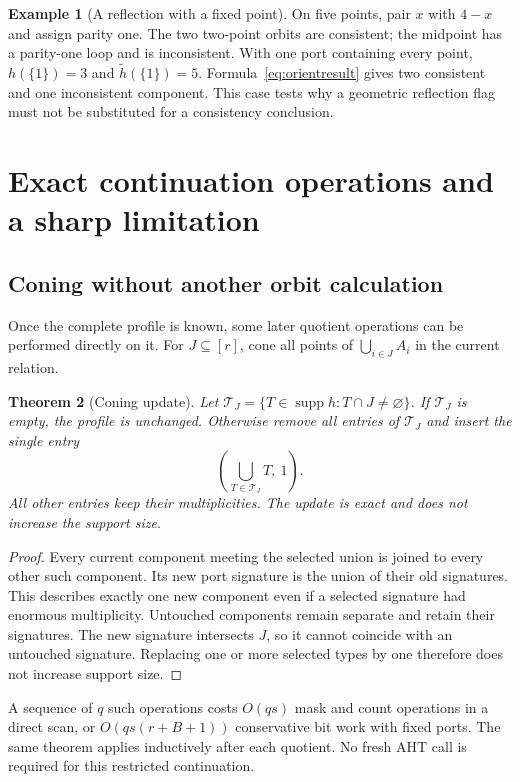 \documentclass[11pt]{article}
\newtheorem{theorem}{Theorem}[section]
\theoremstyle{definition}
\newtheorem{example}[theorem]{Example}
\newcommand{\supp}{\operatorname{supp}}
\begin{document}
\begin{example}[A reflection with a fixed point]
On five points, pair $x$ with $4-x$ and assign parity one. The two two-point
orbits are consistent; the midpoint has a parity-one loop and is inconsistent.
With one port containing every point, $h(\{1\})=3$ and
$\widetilde h(\{1\})=5$. Formula~\eqref{eq:orientresult} gives two consistent
and one inconsistent component. This case tests why a geometric reflection
flag must not be substituted for a consistency conclusion.
\end{example}

\section{Exact continuation operations and a sharp limitation}
\label{sec:continuations}

\subsection{Coning without another orbit calculation}
Once the complete profile is known, some later quotient operations can be
performed directly on it. For $J\subseteq[r]$, cone all points of
$\bigcup_{i\in J}A_i$ in the current relation.

\begin{theorem}[Coning update]
\label{thm:coneupdate}
Let $\mathcal T_J=\{T\in\supp h:T\cap J\neq\varnothing\}$.
If $\mathcal T_J$ is empty, the profile is unchanged. Otherwise remove
all entries of $\mathcal T_J$ and insert the single entry
\begin{equation}
 \left(\bigcup_{T\in\mathcal T_J}T,\ 1\right).
 \label{eq:coneupdate}
\end{equation}
All other entries keep their multiplicities. The update is exact and does
not increase the support size.
\end{theorem}
\begin{proof}
Every current component meeting the selected union is joined to every
other such component. Its new port signature is the union of their old
signatures. This describes exactly one new component even if a selected
signature had enormous multiplicity. Untouched components remain separate
and retain their signatures. The new signature intersects $J$, so it cannot
coincide with an untouched signature. Replacing one or more selected types
by one therefore does not increase support size.
\end{proof}

A sequence of $q$ such operations costs $O(qs)$ mask and count operations
in a direct scan, or $O(qs(r+B+1))$ conservative bit work with fixed ports.
The same theorem applies inductively after each quotient. No fresh AHT call
is required for this restricted continuation.
\end{document}
